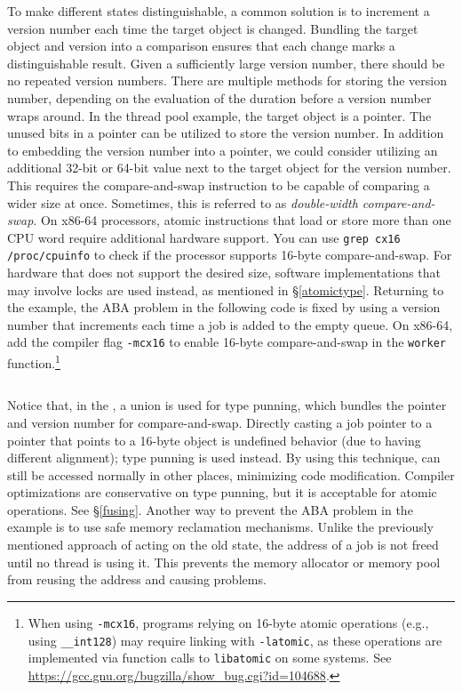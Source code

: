 \documentclass[fontsize=10pt, oneside]{scrartcl}
\newcommand{\monobox}[1]{\mbox{\texttt{#1}}}
\newcommand{\introduce}[1]{\textit{#1}}
\newcommand{\secref}[1]{\hyperref[#1]{\textsc{\S}\ref*{#1}}}
\begin{document}
To make different states distinguishable, a common solution is to increment a version number each time the target object is changed.
Bundling the target object and version into a comparison ensures that each change marks a distinguishable result.
Given a sufficiently large version number, there should be no repeated version numbers.
There are multiple methods for storing the version number, depending on the evaluation of the duration before a version number wraps around.
In the thread pool example, the target object is a pointer. The unused bits in a pointer can be utilized to store the version number.
In addition to embedding the version number into a pointer, we could consider utilizing an additional 32-bit or 64-bit value next to the target object for the version number.
This requires the compare-and-swap instruction to be capable of comparing a wider size at once.
Sometimes, this is referred to as \introduce{double-width compare-and-swap}.
On x86-64 processors, atomic instructions that load or store more than one CPU word require additional hardware support.
You can use \monobox{grep cx16 /proc/cpuinfo} to check if the processor supports 16-byte compare-and-swap.
For hardware that does not support the desired size, software implementations that may involve locks are used instead, as mentioned in \secref{atomictype}.
Returning to the example, the ABA problem in the following code is fixed by using a version number that increments each time a job is added to the empty queue. On x86-64, add the compiler flag \monobox{-mcx16} to enable 16-byte compare-and-swap in the \monobox{worker} function.\footnote{When using \texttt{-mcx16}, programs relying on 16-byte atomic operations (e.g., using \texttt{\_\_int128}) may require linking with \texttt{-latomic}, as these operations are implemented via function calls to \texttt{libatomic} on some systems. See \url{https://gcc.gnu.org/bugzilla/show_bug.cgi?id=104688}.}

\inputminted{c}{./examples/rmw_example_aba.c}

Notice that, in the , a union is used for type punning, which bundles the pointer and version number for compare-and-swap.
Directly casting a job pointer to a pointer that points to a 16-byte object is undefined behavior (due to having different alignment); type punning is used instead.
By using this technique,  can still be accessed normally in other places, minimizing code modification.
Compiler optimizations are conservative on type punning, but it is acceptable for atomic operations.
See \secref{fusing}.
Another way to prevent the ABA problem in the example is to use safe memory reclamation mechanisms.
Unlike the previously mentioned approach of acting on the old state, the address of a job is not freed until no thread is using it.
This prevents the memory allocator or memory pool from reusing the address and causing problems.
\end{document}

